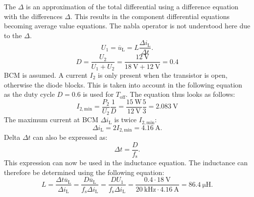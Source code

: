 \begin{solutionblock}
The $\Delta$ is an approximation of the total differential using a difference equation with the differences $\Delta$. This results in the component differential equations becoming average value equations. The nabla operator is not understood here due to the $\Delta$.
    \begin{equation}
        U_{\mathrm{1}} = \overline u_{\mathrm{L}} = L \frac{\Delta i_{\mathrm{L}} }{\Delta t}. 
    \end{equation}
\begin{equation}
    D = \frac{U_\mathrm{2}}{U_\mathrm{1}+U_\mathrm{2}} = \frac{\SI{12}{\volt}}{\SI{18}{\volt}+\SI{12}{\volt}} = 0.4
\end{equation}
BCM is assumed. A current $I_\mathrm{2}$ is only present when the transistor is open, otherwise the diode blocks. This is taken into account in the following equation as the duty cycle $D = 0.6$ is used for $T_\mathrm{off}$. The equation thus looks as follows:
\begin{equation}
    I_\mathrm{2,min} = \frac{P_\mathrm{2}}{U_\mathrm{2}} \frac{1}{D}=\frac{\SI{15}{\watt}}{\SI{12}{\volt}}\frac{5}{3}=\SI{2.083}{\volt}
\end{equation}
The maximum current at BCM $\Delta i_{\mathrm{L}}$ is twice  $I_\mathrm{2,min}$:
\begin{equation}
    \Delta i_{\mathrm{L}} = 2  I_\mathrm{2,min} = \SI{4.16}{\ampere}.
\end{equation}
Delta $\Delta t$ can also be expressed as:
\begin{equation}
    \Delta t = \frac{D}{f_\mathrm{s}}.
\end{equation}
This expression can now be used in the inductance equation. The inductance can therefore be determined using the following equation:
\begin{equation}
    L = \frac{\Delta t  \overline u_{\mathrm{L}}}{\Delta i_{\mathrm{L}}}= \frac{D \overline u_{\mathrm{L}}}{f_\mathrm{s}\Delta i_{\mathrm{L}}}= \frac{D U_{\mathrm{1}}}{f_\mathrm{s}\Delta i_{\mathrm{L}}} = \frac{0.4 \cdot \SI{18}{\volt}}{\SI{20}{\kilo\hertz}\cdot \SI{4.16}{\ampere }} = \SI{86.4}{\micro\henry}.
\end{equation}

\end{solutionblock}

